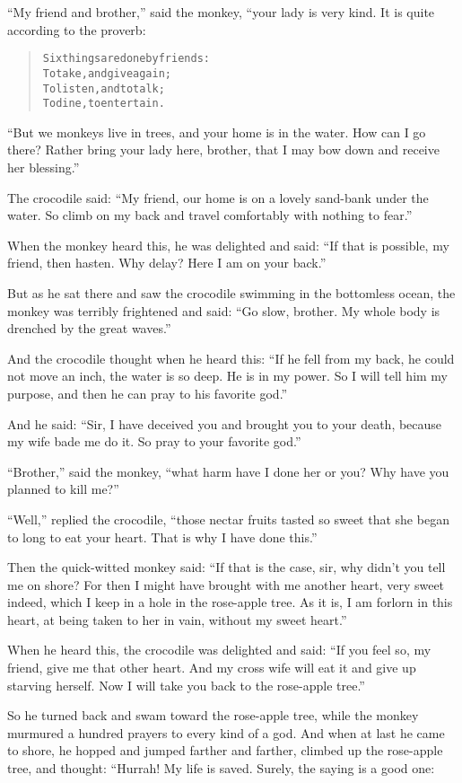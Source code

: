 \documentclass[article, twoside, 14pt]{memoir}
\renewenvironment{verbatim}{%
\begin{quote}%
\vskip -10pt%
\begin{alltt}\normalfont\large}{\end{alltt}%
\end{quote}%
\vskip -10pt
} %
\begin{document}
``My friend and brother,'' said the monkey, “your lady is very
kind. It is quite according to the proverb:

\begin{verbatim}
Six things are done by friends:
To take, and give again;
To listen, and to talk;
To dine, to entertain.
\end{verbatim}
``But we monkeys live in trees, and your home is in the water. How can I go there? Rather bring your lady here, brother, that I may bow down and receive her blessing.''

The crocodile said:
``My friend, our home is on a lovely sand-bank under the water. So climb on my back and travel comfortably with nothing to fear.''

When the monkey heard this, he was delighted and said:
``If that is possible, my friend, then hasten. Why delay? Here I am on your back.''

But as he sat there and saw the crocodile swimming in the
bottomless ocean, the monkey was terribly frightened and said:
``Go slow, brother. My whole body is drenched by the great waves.''

And the crocodile thought when he heard this:
``If he fell from my back, he could not move an inch, the water is so deep. He is in my power. So I will tell him my purpose, and then he can pray to his favorite god.''

And he said:
``Sir, I have deceived you and brought you to your death, because my wife bade me do it. So pray to your favorite god.''

``Brother,'' said the monkey,
``what harm have I done her or you? Why have you planned to kill me?''

``Well,'' replied the crocodile,
``those nectar fruits tasted so sweet that she began to long to eat your heart. That is why I have done this.''

Then the quick-witted monkey said:
``If that is the case, sir, why didn't you tell me on shore? For then I might have brought with me another heart, very sweet indeed, which I keep in a hole in the rose-apple tree. As it is, I am forlorn in this heart, at being taken to her in vain, without my sweet heart.''

When he heard this, the crocodile was delighted and said:
``If you feel so, my friend, give me that other heart. And my cross wife will eat it and give up starving herself. Now I will take you back to the rose-apple tree.''

So he turned back and swam toward the rose-apple tree, while the
monkey murmured a hundred prayers to every kind of a god. And when
at last he came to shore, he hopped and jumped farther and farther,
climbed up the rose-apple tree, and thought: “Hurrah! My life is
saved. Surely, the saying is a good one:
\end{document}

